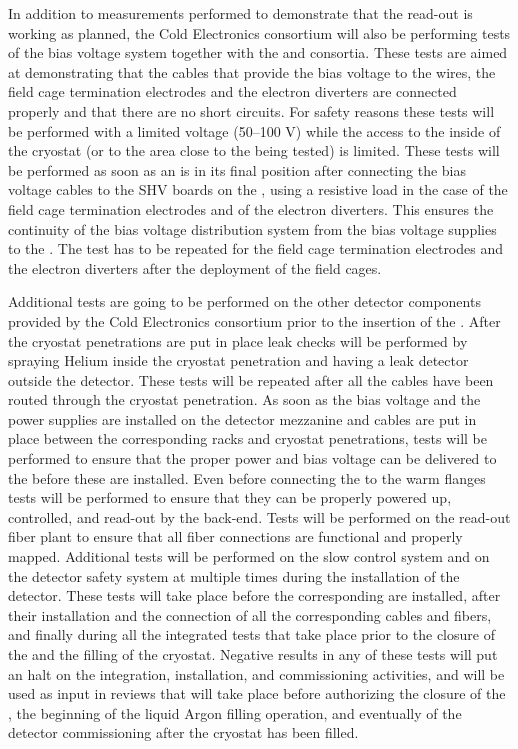 In addition to measurements performed to demonstrate that the 
read-out is working as planned, the Cold Electronics consortium will also
be performing tests of the bias voltage system together with the 
and  consortia. These tests are aimed at demonstrating that
the cables that provide the bias voltage to the  wires, the
field cage termination electrodes and the electron diverters are connected
properly and that there are no short circuits. For safety reasons these
tests will be performed with a limited voltage (50--100 V) while the access
to the inside of the cryostat (or to the area close to the  being
tested) is limited. These tests will be performed as soon as an 
is in its final position after connecting the bias voltage cables to the 
SHV boards on the , using a resistive load in the case of the 
field cage termination electrodes and of the electron diverters. This ensures
the continuity of the bias voltage distribution system from the bias voltage
supplies to the . The test has to be repeated for the field cage
termination electrodes and the electron diverters after the deployment of
the field cages.

Additional tests are going to be performed on the other detector components
provided by the Cold Electronics consortium prior to the insertion of the
. After the cryostat penetrations are put in place leak checks
will be performed by spraying Helium inside the cryostat penetration and
having a leak detector outside the detector. These tests will be repeated 
after all the cables have been routed through the cryostat penetration.
As soon as the bias voltage and the power supplies are installed on the detector
mezzanine and cables are put in place between the corresponding racks and
cryostat penetrations, tests will be performed to ensure that the proper 
power and bias voltage can be delivered to the  before these
are installed. Even before connecting the  to the warm flanges
tests will be performed to ensure that they can be properly powered up, controlled,
and read-out by the  back-end. Tests will be performed on the
read-out fiber plant to ensure that all fiber connections are functional
and properly mapped. Additional tests will be performed on the slow control
system and on the detector safety system at multiple times during the
installation of the detector. These tests will take place before the
corresponding  are installed, after their installation and
the connection of all the corresponding cables and fibers, and finally
during all the integrated tests that take place prior to the closure of
the  and the filling of the cryostat. Negative results in any
of these tests will put an halt on the integration, installation, and
commissioning activities, and will be used as input in reviews that will
take place before authorizing the closure of the , the beginning
of the liquid Argon filling operation, and eventually of the detector 
commissioning after the cryostat has been filled.

